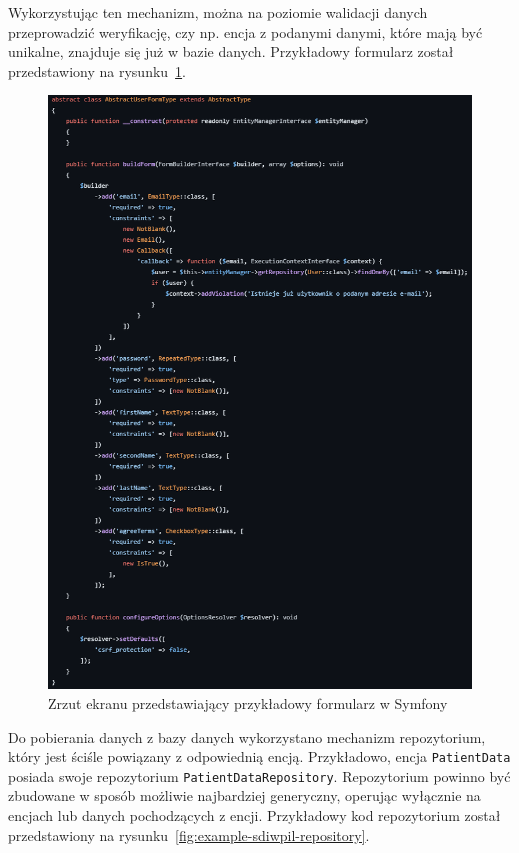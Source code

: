 \documentclass[12pt,twoside]{book}
\newcommand{\captionvspace}{\vspace{6pt}}
\begin{document}
    Wykorzystując ten mechanizm, można na poziomie walidacji danych przeprowadzić weryfikację, czy np. encja z podanymi danymi, które mają być unikalne, znajduje się już w bazie danych. Przykładowy formularz został przedstawiony na rysunku~\ref{fig:example-sdiwpil-form}.

    \begin{figure}[ht]
        \centering
        \includegraphics[width=\textwidth]{includes/images/example-form-before-migration.png}
        \captionvspace
        \caption{Zrzut ekranu przedstawiający przykładowy formularz w Symfony}
        \label{fig:example-sdiwpil-form}
    \end{figure}

    Do pobierania danych z bazy danych wykorzystano mechanizm repozytorium, który jest ściśle powiązany z odpowiednią encją. Przykładowo, encja \texttt{PatientData} posiada swoje repozytorium \texttt{PatientDataRepository}. Repozytorium powinno być zbudowane w sposób możliwie najbardziej generyczny, operując wyłącznie na encjach lub danych pochodzących z encji. Przykładowy kod repozytorium został przedstawiony na rysunku~\ref{fig:example-sdiwpil-repository}.
\end{document}
